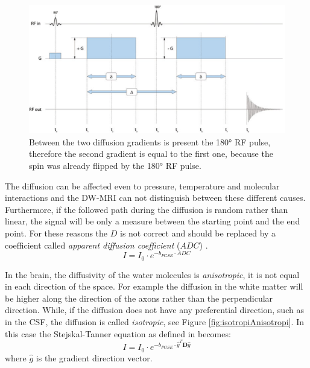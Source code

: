  \begin{figure}[h]
    \centering
    \begin{minipage}[c]{0.70\textwidth}
      \includegraphics[width=\textwidth]{images/PGSE.png}
    \end{minipage}\hfill
    \begin{minipage}[c]{0.25\textwidth}
      \caption{Between the two diffusion gradients is present the 180° RF pulse, therefore the second gradient is equal to the first one, because the spin was already flipped by the 180° RF pulse. \cite{elementiRisonanza}}
    \label{fig:PGSE}
    \end{minipage}
 \end{figure}

 The diffusion can be affected even to pressure, temperature and molecular interactions and the DW-MRI can not distinguish between these different causes. Furthermore, if the followed path during the diffusion is random rather than linear, the signal will be only a measure between the starting point and the end point. For these reasons the $D$ is not correct and should be replaced by a coefficient called \emph{apparent diffusion coefficient} ($ADC$) \cite{elementiRisonanza}.
 \begin{equation}
    I = I_0 \cdot e^{-b_{PGSE} \cdot ADC}
 \end{equation}

 In the brain, the diffusivity of the water molecules is \emph{anisotropic}, it is not equal in each direction of the space. For example the diffusion in the white matter will be higher along the direction of the axons rather than the perpendicular direction. While, if the diffusion does not have any preferential direction, such as in the CSF, the diffusion is called \emph{isotropic}, see Figure \ref{fig:isotropiAnisotropi}. In this case the Stejskal-Tanner equation as defined in \cite{dtiBook} becomes:
 \begin{equation}
    I = I_0 \cdot e^{-b_{PGSE} \cdot \hat{g}^T\mathbf{D}\hat{g}}
 \end{equation}
 where $\hat{g}$ is the gradient direction vector.

